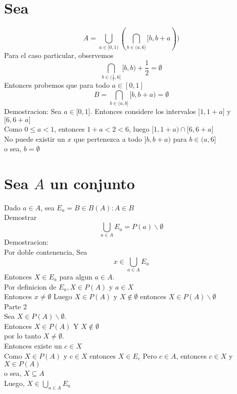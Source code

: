 \documentclass{article}
\begin{document}
\section{ Sea }
\[
A = \bigcup_{a \in [0,1)} ( \bigcap_{b \in (a,6]} [b,b+a))
\]
Para el caso particular, observemos
\[
\bigcap_{b \in ( \frac{1}{2} , 6]} [b,b) + \frac{1}{2} = \emptyset
\]
Entonces probemos que para todo $ a \in [0,1] $
\[
B = \bigcap_{b \in (a,b]} \lbrack b, b+a) = \emptyset
\]
Demostracion: 
Sea $a \in \lbrack 0, 1 \rbrack$. Entonces considere los intervalos $ \lbrack 1, 1+a \rbrack $ y $ \lbrack 6, 6+a \rbrack$ \\
Como $ 0 \leq a < 1$, entonces $ 1+a < 2 < 6 $, luego $ \lbrack 1, 1+a )  \cap \lbrack 6, 6+a \rbrack$ \\
No puede existir un $x$ que pertenezca a todo $ \rbrack b, b+a)$ para $ b \in  (a,6 \rbrack $ \\
o sea, $ b = \emptyset$
\section{Sea $A$ un conjunto}
Dado $ a \in A$, sea $E_{a} = { B \in B(A) : A \in B}$ \\
Demostrar
\[
\bigcup_{a \in A} E_{a} = P(a) \backslash {\emptyset}
\]
Demostracion: \\
Por doble contenencia, Sea 
\[
x \in \bigcup_{a \in A} E_{a}
\]
Entonces $X \in E_a $ para algun $ a \in A $. \\
Por definicion de $E_a, X \in P(A)$ y $ a \in X $ \\
Entonces $ x \neq \emptyset $ 
Luego $X \in P(A)$ y $X \not \in {\emptyset}$ entonces $X \in P(A) \backslash {\emptyset}$ \\
Parte 2 \\
Sea $ X \in P(A) \backslash {\emptyset}$. \\
Entonces $X \in P(A)$ Y $X \not \in  {\emptyset} $ \\
por lo tanto $X \neq \emptyset$. \\
Entonces existe un $ c \in X $  \\
Como $ X \in  P(A)$ y $c \in X$
entonces $X \in E_c$ 
Pero $ c \in A $, entonces $ c \in X$ y $X \in P(A)$ \\ 
o sea, $X \subseteq A$ \\
Luego, $X \in \bigcup_{a \in A} E_a$
\end{document}
